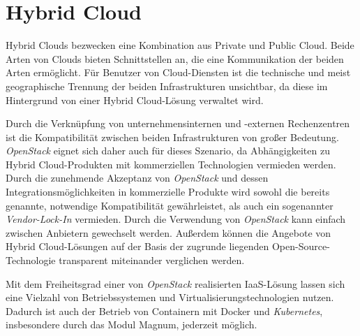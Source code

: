 \documentclass[../main.tex]{subfiles}
\begin{document}

  \section{Hybrid Cloud}
  \label{hybridCloud}
    Hybrid Clouds bezwecken eine Kombination aus Private und Public Cloud. Beide Arten von Clouds bieten Schnittstellen an, die eine Kommunikation der beiden Arten ermöglicht. Für Benutzer von Cloud-Diensten ist die technische und meist geographische Trennung der beiden Infrastrukturen unsichtbar, da diese im Hintergrund von einer Hybrid Cloud-Lösung verwaltet wird.

    Durch die Verknüpfung von unternehmensinternen und -externen Rechenzentren ist die Kompatibilität zwischen beiden Infrastrukturen von großer Bedeutung. \emph{OpenStack} eignet sich daher auch für dieses Szenario, da Abhängigkeiten zu Hybrid Cloud-Produkten mit kommerziellen Technologien vermieden werden. Durch die zunehmende Akzeptanz von \emph{OpenStack} und dessen Integrationsmöglichkeiten in kommerzielle Produkte wird sowohl die bereits genannte, notwendige Kompatibilität gewährleistet, als auch ein sogenannter \emph{Vendor-Lock-In} vermieden. Durch die Verwendung von \emph{OpenStack} kann einfach zwischen Anbietern gewechselt werden. Außerdem können die Angebote von Hybrid Cloud-Lösungen auf der Basis der zugrunde liegenden Open-Source-Technologie transparent miteinander verglichen werden.

    Mit dem Freiheitsgrad einer von \emph{OpenStack} realisierten IaaS-Lösung lassen sich eine Vielzahl von Betriebssystemen und Virtualisierungstechnologien nutzen. Dadurch ist auch der Betrieb von Containern mit Docker und \emph{Kubernetes}, insbesondere durch das Modul Magnum, jederzeit möglich.





\end{document}
